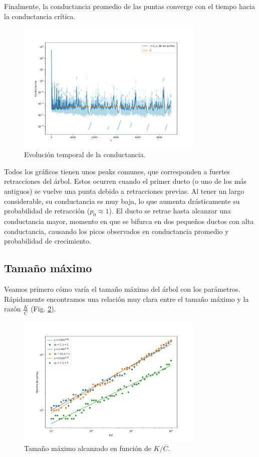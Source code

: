 \documentclass{article}
\begin{document}
Finalmente, la conductancia promedio de las puntas converge con el tiempo hacia la conductancia crítica.

\begin{figure}[h!]
    \centering
    \includegraphics[width=0.8\textwidth]{graficos_inst/Cij_vs_tiempo.png}
    \caption{Evolución temporal de la conductancia.}
    \label{fig:evolucion_conductancia}
\end{figure}

Todos los gráficos tienen unos peaks comunes, que corresponden a fuertes retracciones del árbol. Estos ocurren cuando el primer ducto (o uno de los más antiguos) se vuelve una punta debido a retracciones previas. Al tener un largo considerable, su conductancia es muy baja, lo que aumenta drásticamente su probabilidad de retracción ($p_0 \approx 1$). El ducto se retrae hasta alcanzar una conductancia mayor, momento en que se bifurca en dos pequeños ductos con alta conductancia, causando los picos observados en conductancia promedio y probabilidad de crecimiento.
\newpage
\subsection{Tamaño máximo}

Veamos primero cómo varía el tamaño máximo del árbol con los parámetros. Rápidamente encontramos una relación muy clara entre el tamaño máximo y la razón $\frac{K}{\bar{C}}$ (Fig. \ref{fig:max_vs_KC}).

\begin{figure}[h!]
    \centering
    \includegraphics[width=0.8\textwidth]{graficos_inst/max_vs_KC.png}
    \caption{Tamaño máximo alcanzado en función de $K/\bar{C}$.}
    \label{fig:max_vs_KC}
\end{figure}
\end{document}
